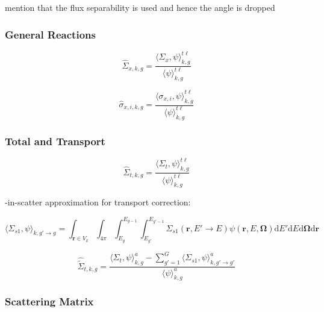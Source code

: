 mention that the flux separability is used and hence the angle is dropped

\subsubsection{General Reactions}
\label{subsubsec:chap3-gen-xs}

\begin{equation}
\label{eqn:chap3-general-macro}
\hat{\Sigma}_{x,k,g} = \frac{\langle \Sigma_{x}, \psi \rangle_{k,g}^{t\ell}}{\langle \psi \rangle_{k,g}^{t\ell}}
\end{equation}

\begin{equation}
\label{eqn:chap3-general-micro}
\hat{\sigma}_{x,i,k,g} = \frac{\langle \sigma_{x,i}, \psi \rangle_{k,g}^{t\ell}}{\langle \psi \rangle_{k,g}^{t\ell}}
\end{equation}



\subsubsection{Total and Transport}
\label{subsubsec:chap3-tally-types-tot-xs}

\begin{equation}
\label{eqn:chap3-total-macro}
\hat{\Sigma}_{t,k,g} = \frac{\langle \Sigma_{t}, \psi \rangle_{k,g}^{t\ell}}{\langle \psi \rangle_{k,g}^{t\ell}}
\end{equation}

-in-scatter approximation for transport correction:

\begin{equation}
\label{eqn:chap3-sigs1}
\langle \Sigma_{s1}, \psi \rangle_{k,g'\rightarrow g} = \int_{\mathbf{r} \in V_{k}} \int_{4\pi} \int_{E_{g}}^{E_{g-1}} \int_{E_{g'}}^{E_{g'-1}} \Sigma_{s1}(\mathbf{r},E'\rightarrow E)\psi(\mathbf{r},E,\mathbf{\Omega}) \mathrm{d}E'\mathrm{d}E\mathrm{d}\mathbf{\Omega}\mathrm{d}\mathbf{r}
\end{equation}

\begin{equation}
\label{eqn:chap3-transport-macro}
\hat{\tilde{\Sigma}}_{t,k,g} = \frac{\langle \Sigma_{t}, \psi \rangle_{k,g}^{a} - \displaystyle\sum\limits_{g'=1}^{G} \langle{\Sigma_{s1}, \psi \rangle_{k,g'\rightarrow g'}^{a}}}
{\langle \psi \rangle_{k,g}^{a}}
\end{equation}


\subsubsection{Scattering Matrix}
\label{subsubsec:chap3-tally-types-scatt-mat}

